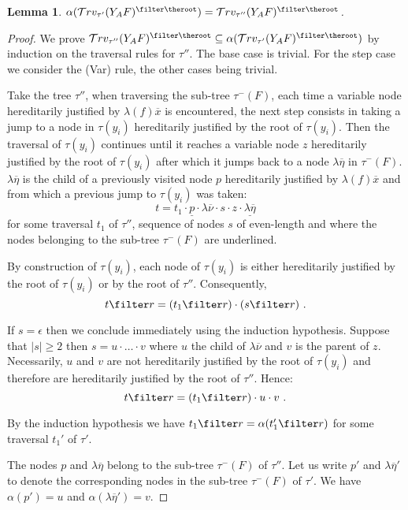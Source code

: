 \documentclass{article}
\newtheorem{lemma}[theorem]{Lemma}
\newcommand{\travset}{\mathcal{T}rv}
\begin{document}
\begin{lemma}
$\alpha(\travset_{\tau'}(Y_A F)^{\filter \theroot}) =
\travset_{\tau''}(Y_A F)^{\filter \theroot}$.
\end{lemma}
\begin{proof}
We prove $\travset_{\tau''}(Y_A F)^{\filter \theroot} \subseteq
\alpha(\travset_{\tau'}(Y_A F)^{\filter \theroot})$ by induction on
the traversal rules for $\tau''$. The base case is trivial. For the
step case we consider the (Var) rule, the other cases being trivial.

Take the tree $\tau''$, when traversing the sub-tree $\tau^-(F)$, each time a variable node hereditarily justified by $\lambda (f) \overline{x}$ is encountered, the next step consists in taking a jump to a node in $\tau(y_i)$ hereditarily justified by the root of $\tau(y_i)$. Then the traversal of $\tau(y_i)$ continues until it reaches a variable node $z$ hereditarily justified by the root of $\tau(y_i)$ after which it jumps back to a node $\lambda \overline{\eta}$ in $\tau^-(F)$. $\lambda \overline{\eta}$ is the child of a previously visited node $p$ hereditarily justified by $\lambda (f) \overline{x}$ and from which a previous jump to $\tau(y_i)$ was taken:
$$ t = t_1 \cdot \underline{p} \cdot \lambda \overline{\nu} \cdot s \cdot z \cdot \underline{\lambda \overline{\eta}}$$
for some traversal $t_1$ of $\tau''$, sequence of nodes $s$ of even-length and where the nodes belonging to the sub-tree $\tau^-(F)$ are underlined.

By construction of $\tau(y_i)$, each node of $\tau(y_i)$ is either hereditarily justified by the root of $\tau(y_i)$
or by the root of $\tau''$. Consequently,
$$ t\filter r = (t_1\filter r) \cdot  (s \filter r) \ .$$

If $s = \epsilon$ then we conclude immediately using the induction hypothesis.
Suppose that $|s|\geq 2$ then $s = u\cdot \ldots \cdot v$ where $u$ the child of $\lambda \overline{\nu}$ and $v$ is the parent of $z$.
Necessarily, $u$ and $v$ are not hereditarily justified by the root of $\tau(y_i)$ and therefore are hereditarily justified by the root of $\tau''$. Hence:
$$ t\filter r = (t_1\filter r) \cdot  u \cdot v \ .$$

By the  induction hypothesis we have $t_1\filter r =
\alpha(t_1'\filter r)$ for some traversal $t_1'$  of $\tau'$.

The nodes $p$ and $\lambda \overline{\eta}$ belong
to the sub-tree $\tau^-(F)$ of $\tau''$. Let us write $p'$ and $\lambda \overline{\eta}'$ to denote the corresponding nodes in the sub-tree $\tau^-(F)$ of $\tau'$. We have $\alpha(p') = u$ and $\alpha(\lambda \overline{\eta}') = v$.


\end{proof}
\end{document}
